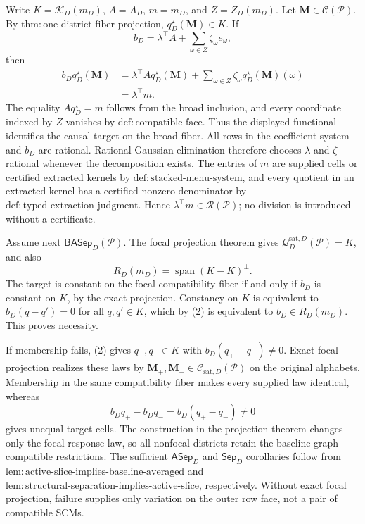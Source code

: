 Write \(K=\mathcal K_D(m_D)\), \(A=A_D\), \(m=m_D\), and \(Z=Z_D(m_D)\).  Let \(\mathbf M\in\mathcal C(\mathcal P)\).  By \(\mathrm{thm:one\text{-}district\text{-}fiber\text{-}projection}\), \(q_D^\star(\mathbf M)\in K\).  If
\[
b_D=\lambda^\top A+
\sum_{\omega\in Z}\zeta_\omega e_\omega,
\]
then
\[
\begin{aligned}
b_Dq_D^\star(\mathbf M)
&=\lambda^\top A q_D^\star(\mathbf M)
+\sum_{\omega\in Z}\zeta_\omega q_D^\star(\mathbf M)(\omega)\\
&=\lambda^\top m.
\end{aligned}
\tag{1}
\]
The equality \(Aq_D^\star=m\) follows from the broad inclusion, and every coordinate indexed by \(Z\) vanishes by \(\mathrm{def:compatible\text{-}face}\).  Thus the displayed functional identifies the causal target on the broad fiber.  All rows in the coefficient system and \(b_D\) are rational.  Rational Gaussian elimination therefore chooses \(\lambda\) and \(\zeta\) rational whenever the decomposition exists.  The entries of \(m\) are supplied cells or certified extracted kernels by \(\mathrm{def:stacked\text{-}menu\text{-}system}\), and every quotient in an extracted kernel has a certified nonzero denominator by \(\mathrm{def:typed\text{-}extraction\text{-}judgment}\).  Hence \(\lambda^\top m\in\mathscr R(\mathcal P)\); no division is introduced without a certificate.

Assume next \(\mathsf{BASep}_D(\mathcal P)\).  The focal projection theorem gives \(\mathcal Q_D^{\mathrm{sat},D}(\mathcal P)=K\), and also
\[
R_D(m_D)=\operatorname{span}(K-K)^\perp.
\tag{2}
\]
The target is constant on the focal compatibility fiber if and only if \(b_D\) is constant on \(K\), by the exact projection.  Constancy on \(K\) is equivalent to
\(b_D(q-q')=0\) for all \(q,q'\in K\), which by (2) is equivalent to \(b_D\in R_D(m_D)\).  This proves necessity.

If membership fails, (2) gives \(q_+,q_-\in K\) with \(b_D(q_+-q_-)\ne0\).  Exact focal projection realizes these laws by \(\mathbf M_+,\mathbf M_-\in\mathcal C_{\mathrm{sat},D}(\mathcal P)\) on the original alphabets.  Membership in the same compatibility fiber makes every supplied law identical, whereas
\[
b_Dq_+-b_Dq_-=b_D(q_+-q_-)\ne0
\]
gives unequal target cells.  The construction in the projection theorem changes only the focal response law, so all nonfocal districts retain the baseline graph-compatible restrictions.  The sufficient \(\mathsf{ASep}_D\) and \(\mathsf{Sep}_D\) corollaries follow from \(\mathrm{lem:active\text{-}slice\text{-}implies\text{-}baseline\text{-}averaged}\) and \(\mathrm{lem:structural\text{-}separation\text{-}implies\text{-}active\text{-}slice}\), respectively.  Without exact focal projection, failure supplies only variation on the outer row face, not a pair of compatible SCMs.